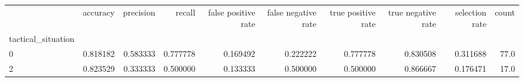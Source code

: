 \begin{tabular}{lrrrrrrrrr}
\toprule
{} &  accuracy &  precision &    recall &  false positive rate &  false negative rate &  true positive rate &  true negative rate &  selection rate &  count \\
tactical\_situation &           &            &           &                      &                      &                     &                     &                 &        \\
\midrule
0                  &  0.818182 &   0.583333 &  0.777778 &             0.169492 &             0.222222 &            0.777778 &            0.830508 &        0.311688 &   77.0 \\
2                  &  0.823529 &   0.333333 &  0.500000 &             0.133333 &             0.500000 &            0.500000 &            0.866667 &        0.176471 &   17.0 \\
\bottomrule
\end{tabular}
